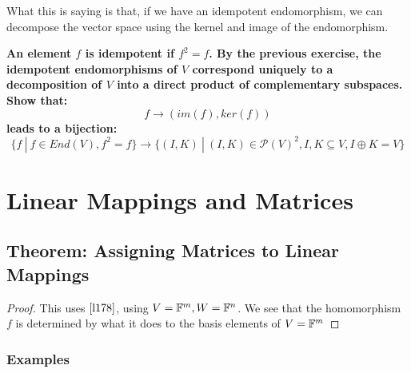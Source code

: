 \documentclass{exam}
\begin{document}
\begin{questions}
What this is saying is that, if we have an idempotent endomorphism, we can decompose the vector space using the kernel and image of the endomorphism.

\question \textbf{An element $f$ is idempotent if $f^2 = f$. By the previous exercise, the idempotent endomorphisms of $V$ correspond uniquely to a decomposition of $V$ into a direct product of complementary subspaces. Show that:
\[
f \to (im(f), ker(f))
\]
leads to a bijection:
\[
\{f \ | \ f \in End(V), f^2 = f\} \to \{(I,K) \ | \ (I,K) \in \mathcal{P}(V)^2, I,K \subseteq V, I \oplus K = V\}
\]}

\end{questions}

\section{Linear Mappings and Matrices}

\subsection{Theorem: Assigning Matrices to Linear Mappings}


\begin{proof}

This uses $\eqref{l178}$, using $V = \mathbb{F}^m, W = \mathbb{F}^n$. We see that the homomorphism $f$ is determined by what it does to the basis elements of $V = \mathbb{F}^m$

\end{proof}

\subsubsection{Examples}
\end{document}
